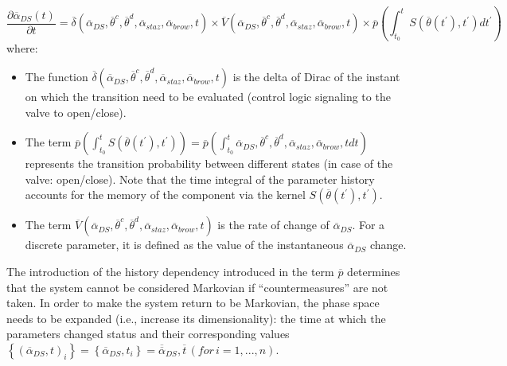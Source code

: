 \begin{equation}
\label{eq:systemDiscAndStochVaryVars}
\frac{\partial  \overline{\alpha }_{DS}\left ( t \right )}{\partial t}=  \overline{\delta}\left ( \overline{\alpha }_{DS}, \overline{\theta}^{c},\overline{\theta}^{d},\overline{\alpha}_{staz},\overline{\alpha}_{brow},t \right ) \times \overline{V}\left ( \overline{\alpha }_{DS}, \overline{\theta}^{c},\overline{\theta}^{d},\overline{\alpha}_{staz},\overline{\alpha}_{brow},t \right ) \times \overline{p}\left ( \int_{t_{0}}^{t}  S\left ( \overline{\theta}\left ( t^{'} \right ),t^{'} \right )dt^{'} \right )
\end{equation}
where:
\begin{itemize}
  \item The function $\overline{\delta}\left ( \overline{\alpha }_{DS}, \overline{\theta}^{c},\overline{\theta}^{d},
  \overline{\alpha}_{staz},\overline{\alpha}_{brow},t \right )$ is the delta of Dirac of the instant on which the
  transition need to be evaluated (control logic signaling to the valve to open/close).
  \item The term $\overline{p}\left ( \int_{t_{0}}^{t}  S\left ( \overline{\theta}\left ( t^{'} \right ),t^{'} \right )\right )
  = \overline{p}\left ( \int_{t_{0}}^{t}  \overline{\alpha }_{DS}, \overline{\theta}^{c},\overline{\theta}^{d},
  \overline{\alpha}_{staz},\overline{\alpha}_{brow},t dt\right )$ represents the transition probability
  between different states (in case of the valve: open/close). Note that the time integral of the
  parameter history accounts for the memory of the component via the kernel $S\left ( \overline{\theta}\left ( t^{'}
  \right ),t^{'} \right )$.
  \item The term $\overline{V}\left ( \overline{\alpha }_{DS}, \overline{\theta}^{c},\overline{\theta}^{d},
  \overline{\alpha}_{staz},\overline{\alpha}_{brow},t \right )$ is the rate of change of $\overline{\alpha }_{DS}$.
  For a discrete parameter, it is defined as the value of the instantaneous $\overline{\alpha }_{DS}$ change.
\end{itemize}
The introduction of the history dependency introduced in the term $\overline{p}$ determines that the system cannot be considered
Markovian if ``countermeasures'' are not taken. In order to make the system return to be Markovian, the phase space needs to be
expanded (i.e., increase its dimensionality): the time at which the
parameters changed status and their corresponding values $\left \{  \left (\overline{\alpha}_{DS}, t \right )_{i} \right \} = \left \{  \overline{\alpha}_{DS}, t_{i} \right \} = \overline{\overline{\alpha}}_{DS}, \overline{t}\, \left ( for\, i=1,...,n \right )$.
